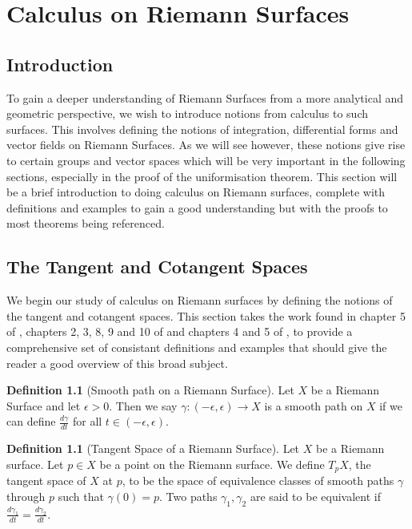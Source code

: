 \documentclass[11pt]{report}
\theoremstyle{definition}
\newtheorem{defn}[thm]{Definition}
\begin{document}
\chapter{Calculus on Riemann Surfaces}
\section{Introduction}
To gain a deeper understanding of Riemann Surfaces from a more analytical
and geometric perspective, we wish to introduce notions from calculus to
such surfaces. This involves defining the notions of integration,
differential forms and vector fields on Riemann Surfaces. As we will see
however, these notions give rise to certain groups and vector spaces
which will be very important in the following sections, especially in the
proof of the uniformisation theorem. This section will be a brief introduction
to doing calculus on Riemann surfaces, complete with definitions and examples to gain a good understanding but with the proofs to most theorems being referenced.

\section{The Tangent and Cotangent Spaces}
We begin our study of calculus on Riemann surfaces by defining the notions of
the tangent and cotangent spaces. This section takes the work found in chapter 5 of \cite{donaldson}, chapters 2, 3, 8, 9 and 10 of \cite{calcohomo} and chapters 4 and 5 of \cite{spivak}, to provide a comprehensive set of consistant definitions and examples that should give the reader a good overview of this broad subject.

\begin{defn}[Smooth path on a Riemann Surface]\label{Smooth Path}
  Let $X$ be a Riemann Surface and let $\epsilon > 0$. Then we say
  $\gamma:(-\epsilon,\epsilon) \rightarrow X$ is a smooth path on $X$ if
  we can define $\frac{d\gamma}{dt}$ for all $t \in (-\epsilon,\epsilon)$.
\end{defn}

\begin{defn}[Tangent Space of a Riemann Surface]\label{TpX}
  Let $X$ be a Riemann surface. Let $p \in X$ be a point on the Riemann
  surface. We define $T_pX$, the tangent space of $X$ at
  $p$, to be the
  space of equivalence classes of smooth paths $\gamma$ through $p$ such
  that $\gamma(0)=p$. Two paths $\gamma_1, \gamma_2$ are said to be
  equivalent if $\frac{d\gamma_1}{dt}=\frac{d\gamma_2}{dt}$.
\end{defn}
\end{document}
